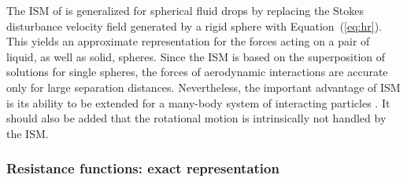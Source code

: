 \documentclass[../thesis.tex]{subfiles}
\begin{document}
The ISM of \cite{WAG05} is generalized for spherical fluid drops by replacing the Stokes disturbance velocity field generated by a rigid sphere with Equation~(\ref{eq:hr}). This yields an approximate representation for the forces acting on a pair of liquid, as well as solid, spheres. Since the ISM is based on the superposition of solutions for single spheres, the forces of aerodynamic interactions are accurate only for large separation distances. Nevertheless, the important advantage of ISM is its ability to be extended for a many-body system of interacting particles \citep{AGW07}. It should also be added that the rotational motion is intrinsically not handled by the ISM.

\subsubsection{Resistance functions: exact representation}
\end{document}
